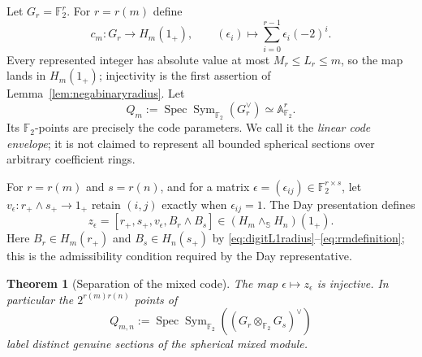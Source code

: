 \documentclass[11pt]{amsart}
\newtheorem{theorem}{Theorem}[section]
\theoremstyle{definition}
\theoremstyle{remark}
\newcommand{\Spec}{\operatorname{Spec}}
\begin{document}
Let $G_r=\mathbb F_2^r$.  For $r=r(m)$ define
\begin{equation}\label{eq:oneCode}
 c_m:G_r\longrightarrow H_m(1_+),\qquad
 (\epsilon_i)\longmapsto\sum_{i=0}^{r-1}\epsilon_i(-2)^i.
\end{equation}
Every represented integer has absolute value at most
$M_r\leq L_r\leq m$, so the map lands in $H_m(1_+)$; injectivity is the
first assertion of Lemma~\ref{lem:negabinaryradius}.  Let
\begin{equation}\label{eq:oneEnvelope}
 Q_m:=\Spec\operatorname{Sym}_{\mathbb F_2}(G_r^\vee)
       \simeq\mathbb A^r_{\mathbb F_2}.
\end{equation}
Its $\mathbb F_2$-points are precisely the code parameters.  We call it the
\emph{linear code envelope}; it is not claimed to represent all bounded
spherical sections over arbitrary coefficient rings.

For $r=r(m)$ and $s=r(n)$, and for a matrix
$\epsilon=(\epsilon_{ij})\in\mathbb F_2^{r\times s}$, let
$v_\epsilon:r_+\wedge s_+\to1_+$ retain $(i,j)$ exactly when
$\epsilon_{ij}=1$.  The Day presentation defines
\begin{equation}\label{eq:mixedSection}
 z_\epsilon=[r_+,s_+,v_\epsilon,B_r\wedge B_s]
       \in(H_m\wedge_{\mathbb S}H_n)(1_+).
\end{equation}
Here $B_r\in H_m(r_+)$ and $B_s\in H_n(s_+)$ by
\eqref{eq:digitL1radius}--\eqref{eq:rmdefinition}; this is the admissibility
condition required by the Day representative.

\begin{theorem}[Separation of the mixed code]
\label{thm:mixedcodeseparation}
The map $\epsilon\mapsto z_\epsilon$ is injective.  In particular the
$2^{r(m)r(n)}$ points of
\begin{equation}\label{eq:mixedEnvelope}
 Q_{m,n}:=\Spec\operatorname{Sym}_{\mathbb F_2}
       ((G_r\otimes_{\mathbb F_2}G_s)^\vee)
\end{equation}
label distinct genuine sections of the spherical mixed module.
\end{theorem}
\end{document}
